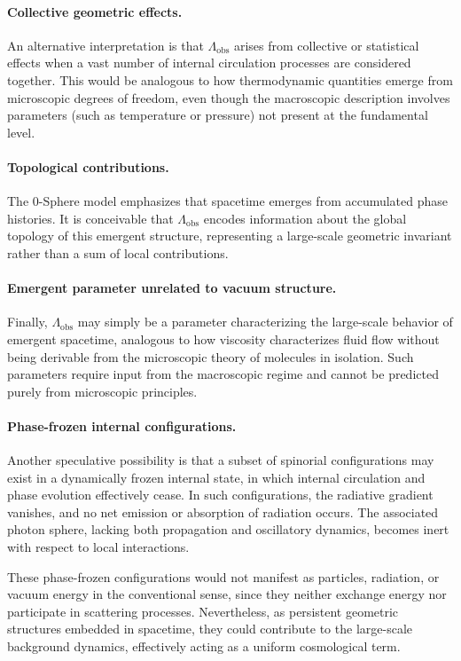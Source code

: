 \documentclass[12pt,letterpaper]{article}
\begin{document}
\paragraph{Collective geometric effects.}
An alternative interpretation is that $\Lambda_{\mathrm{obs}}$ arises from collective or statistical effects when a vast number of internal circulation processes are considered together. This would be analogous to how thermodynamic quantities emerge from microscopic degrees of freedom, even though the macroscopic description involves parameters (such as temperature or pressure) not present at the fundamental level.

\paragraph{Topological contributions.}
The 0-Sphere model emphasizes that spacetime emerges from accumulated phase histories. It is conceivable that $\Lambda_{\mathrm{obs}}$ encodes information about the global topology of this emergent structure, representing a large-scale geometric invariant rather than a sum of local contributions.

\paragraph{Emergent parameter unrelated to vacuum structure.}
Finally, $\Lambda_{\mathrm{obs}}$ may simply be a parameter characterizing the large-scale behavior of emergent spacetime, analogous to how viscosity characterizes fluid flow without being derivable from the microscopic theory of molecules in isolation. Such parameters require input from the macroscopic regime and cannot be predicted purely from microscopic principles.

\paragraph{Phase-frozen internal configurations.}

Another speculative possibility is that a subset of spinorial configurations may exist in a dynamically frozen internal state, in which internal circulation and phase evolution effectively cease. In such configurations, the radiative gradient vanishes, and no net emission or absorption of radiation occurs. The associated photon sphere, lacking both propagation and oscillatory dynamics, becomes inert with respect to local interactions.

These phase-frozen configurations would not manifest as particles, radiation, or vacuum energy in the conventional sense, since they neither exchange energy nor participate in scattering processes. Nevertheless, as persistent geometric structures embedded in spacetime, they could contribute to the large-scale background dynamics, effectively acting as a uniform cosmological term.
\end{document}
